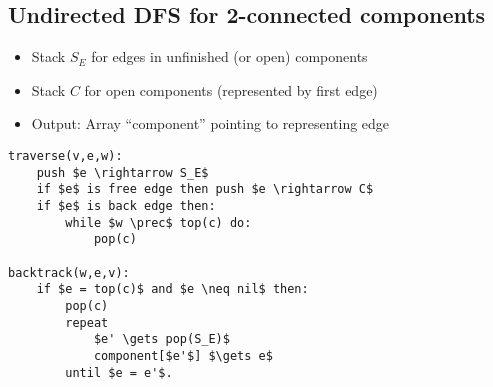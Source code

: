 \subsection{Undirected DFS for 2-connected components}

\begin{itemize}
\item Stack $S_E$ for edges in unfinished (or open) components
\item Stack $C$ for open components (represented by first edge)
\item Output: Array ``component'' pointing to representing edge
\end{itemize}

\begin{lstlisting}[mathescape]
traverse(v,e,w):
    push $e \rightarrow S_E$
    if $e$ is free edge then push $e \rightarrow C$
    if $e$ is back edge then:
        while $w \prec$ top(c) do:
            pop(c)

backtrack(w,e,v):
    if $e = top(c)$ and $e \neq nil$ then:
        pop(c)
        repeat
            $e' \gets pop(S_E)$
            component[$e'$] $\gets e$
        until $e = e'$.
\end{lstlisting}

